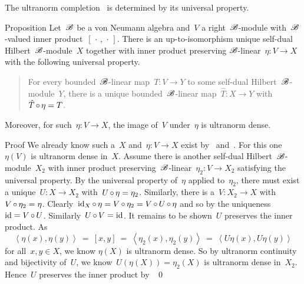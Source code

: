 \begin{parsec}%
\begin{point}%
The ultranorm completion~
    is determined by its universal property.
\end{point}
\begin{point}{Proposition}%
Let~$\mathscr{B}$ be a von Neumann algebra and~$V$ a right~$\mathscr{B}$-module
    with~$\mathscr{B}$-valued inner product~$[\,\cdot\,,\,\cdot\,]$.
There is an up-to-isomorphism unique
    self-dual Hilbert~$\mathscr{B}$-module~$X$
    together with inner product preserving $\mathscr{B}$-linear~$\eta \colon V \to X$
    with the following universal property.
    \begin{quote}
    For every bounded~$\mathscr{B}$-linear map~$T\colon V \to Y$
    to some self-dual Hilbert~$\mathscr{B}$-module~$Y$,
    there is a unique bounded~$\mathscr{B}$-linear map~$\hat{T}\colon X \to Y$
    with~$\hat{T} \mathop{\circ} \eta = T$.
    \end{quote}
Moreover, for such~$\eta\colon V \to X$,
    the image of~$V$ under~$\eta$ is ultranorm dense.
\begin{point}{Proof}%
We already know such a~$X$ and~$\eta\colon V \to X$
    exist by~
    and~.
For this one~$\eta(V)$ is ultranorm dense in~$X$.
Assume there is another self-dual Hilbert~$\mathscr{B}$-module~$X_2$
    with inner product preserving~$\mathscr{B}$-linear~$\eta_2\colon V \to X_2$
    satisfying the universal property.
By the universal property of~$\eta$ applied to~$\eta_2$,
    there must exist a unique~$U \colon X  \to X_2$
    with~$U \mathop{\circ} \eta  = \eta_2$.
Similarly, there is a~$V \colon X_2 \to X$
    with~$V \mathop{\circ} \eta_2 = \eta$.
Clearly~$\operatorname{id}_{X} \mathop{\circ} \eta = V \mathop{\circ} \eta_2 = V \mathop{\circ} U \mathop{\circ} \eta$
    and so by the uniqueness~$\operatorname{id} = V\mathop{\circ} U$.
    Similarly~$U \mathop{\circ} V = \operatorname{id}$.
It remains to be shown~$U$ preserves the inner product.
As
\begin{equation*}
    \left<\eta(x),\eta(y)\right>
    \ =\  [x,y]
    \ =\  \left<\eta_2(x), \eta_2(y)\right>
    \ =\  \left<U \eta(x), U \eta(y)\right>
\end{equation*}
for all~$x,y \in X$, we know
$\eta(X)$ is ultranorm dense.
So by ultranorm continuity and bijectivity of~$U$,
    we know~$U(\eta(X)) = \eta_2(X)$ is ultranorm dense in~$X_2$.
Hence~$U$ preserves the inner product by~
\qed
\end{point}
\end{point}
\end{parsec}

